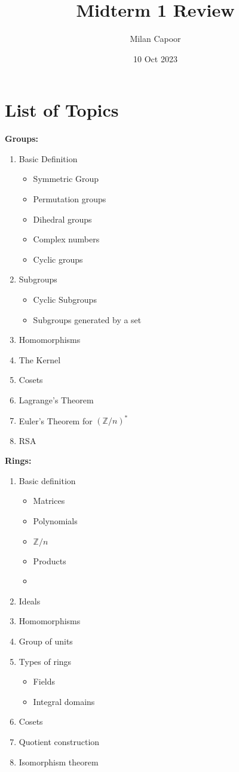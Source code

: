 \documentclass[12pt]{article}
\title{Midterm 1 Review}
\author{Milan Capoor}
\date{10 Oct 2023}
\newcommand{\Z}{\mathbb{Z}}
\begin{document}
\maketitle
\section*{List of Topics}
\textbf{Groups:}
\begin{enumerate}
    \item Basic Definition 
        \begin{itemize}
            \item Symmetric Group
            \item Permutation groups 
            \item Dihedral groups 
            \item Complex numbers
            \item Cyclic groups
        \end{itemize}
    \item Subgroups
        \begin{itemize}
            \item Cyclic Subgroups
            \item Subgroups generated by a set
        \end{itemize}
    \item Homomorphisms 
    \item The Kernel
    \item Cosets 
    \item Lagrange's Theorem 
    \item Euler's Theorem for $(\Z/n)^*$ 
    \item RSA
\end{enumerate}

\textbf{Rings:}
\begin{enumerate}
    \item Basic definition 
        \begin{itemize}
            \item Matrices 
            \item Polynomials 
            \item $\Z/n$
            \item Products 
            \item 
        \end{itemize}
    \item Ideals
    \item Homomorphisms 
    \item Group of units
    \item Types of rings 
        \begin{itemize}
            \item Fields
            \item Integral domains
        \end{itemize}
    \item Cosets 
    \item Quotient construction
    \item Isomorphism theorem 
\end{enumerate}
\end{document}
